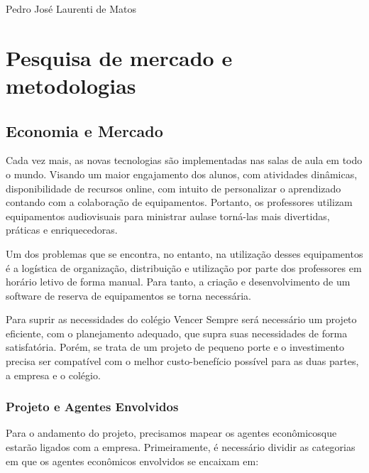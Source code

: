 \documentclass[
	12pt,				%
	openright,			%
	twoside,			%
	a4paper,			%
	english,			%
	french,				%
	spanish,			%
	brazil				%
	]{abntex2}
\begin{document}
Pedro José Laurenti de Matos

\part{Pesquisa de mercado e metodologias}



\chapter{Economia e Mercado}\label{cap_trabalho_academico}

Cada vez mais, as novas tecnologias são implementadas nas salas de aula em
todo o mundo. Visando um maior engajamento dos alunos, com atividades
dinâmicas, disponibilidade de recursos online, com intuito de personalizar o
aprendizado contando com a colaboração de equipamentos. Portanto, os
professores utilizam equipamentos audiovisuais para ministrar aulase torná-las mais
divertidas, práticas e enriquecedoras.

Um dos problemas que se encontra, no entanto, na utilização desses
equipamentos é a logística de organização, distribuição e utilização por parte dos
professores em horário letivo de forma manual. Para tanto, a criação e
desenvolvimento de um software de reserva de equipamentos se torna necessária.

Para suprir as necessidades do colégio Vencer Sempre será necessário um
projeto eficiente, com o planejamento adequado, que supra suas necessidades de
forma satisfatória. Porém, se trata de um projeto de pequeno porte e o investimento
precisa ser compatível com o melhor custo-benefício possível para as duas partes,
a empresa e o colégio.

\section{Projeto e Agentes Envolvidos}

Para o andamento do projeto, precisamos mapear os agentes econômicosque
estarão ligados com a empresa. Primeiramente, é necessário dividir as categorias
em que os agentes econômicos envolvidos se encaixam em:
\end{document}
